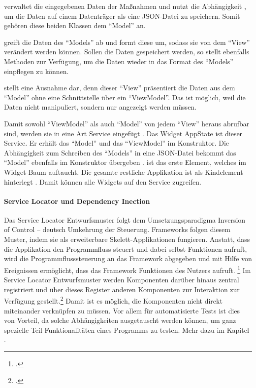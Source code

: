   verwaltet die eingegebenen Daten der Maßnahmen und nutzt die Abhängigkeit  , um die Daten auf einem Datenträger als eine JSON-Datei zu speichern.
Somit gehören diese beiden Klassen dem \enquote{Model} an.

  greift die Daten des \enquote{Models} ab und formt diese um, sodass sie von dem \enquote{View}   verändert werden können.
Sollen die Daten gespeichert werden, so stellt  ebenfalls Methoden zur Verfügung, um die Daten wieder in das Format des \enquote{Models} einpflegen zu können.

  stellt eine Ausnahme dar, denn dieser \enquote{View} präsentiert die Daten aus dem \enquote{Model} ohne eine Schnittstelle über ein \enquote{ViewModel}.
Das ist möglich, weil die Daten nicht manipuliert, sondern nur angezeigt werden müssen.

Damit sowohl \enquote{ViewModel} als auch \enquote{Model} von jedem \enquote{View} heraus abrufbar sind, werden sie in eine Art Service eingefügt .
Das Widget AppState ist dieser Service.
 Er erhält das \enquote{Model}  und das \enquote{ViewModel}   im Konstruktor.
Die Abhängigkeit zum Schreiben des \enquote{Models} in eine JSON-Datei  bekommt das \enquote{Model} ebenfalls im Konstruktor übergeben .
 ist das erste Element, welches im Widget-Baum auftaucht.
Die gesamte restliche Applikation ist als Kindelement hinterlegt .
Damit können alle Widgets auf den Service zugreifen.


\paragraph{Service Locator und Dependency Inection}

Das Service Locator Entwurfsmuster folgt dem Umsetzungsparadigma Inversion of Control -- deutsch Umkehrung der Steuerung.
Frameworks folgen diesem Muster, indem sie als erweiterbare Skelett-Applikationen fungieren.
Anstatt, dass die Applikation den Programmfluss steuert und dabei selbst Funktionen aufruft, wird die Programmflusssteuerung an das Framework abgegeben und mit Hilfe von Ereignissen ermöglicht, dass das Framework Funktionen des Nutzers aufruft.
\footcite[Vgl.][]{johnson1988designing}
Im Service Locator Entwurfsmuster werden Komponenten darüber hinaus zentral registriert und über dieses Register anderen Komponenten zur Interaktion zur Verfügung gestellt.\footcite[Vgl.][]{fowler2004DependencyInjection}
Damit ist es möglich, die Komponenten nicht direkt miteinander verknüpfen zu müssen.
Vor allem für automatisierte Tests ist dies von Vorteil, da solche Abhängigkeiten ausgetauscht werden können, um ganz spezielle Teil-Funktionalitäten eines Programms zu testen.
 Mehr dazu im Kapitel .


